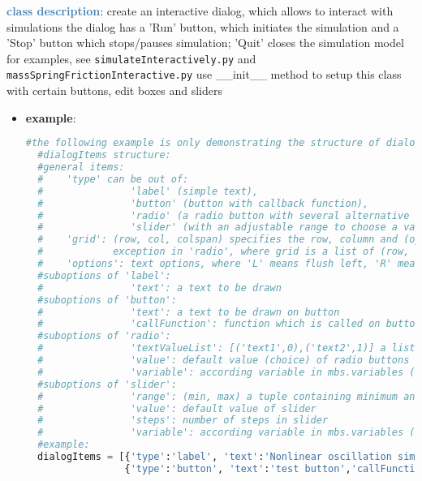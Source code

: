 \begin{itemize}[leftmargin=1.4cm]
\begin{itemize}[leftmargin=1.4cm]
\begin{itemize}[leftmargin=1.4cm]
\begin{itemize}[leftmargin=0.5cm]
\begin{itemize}[leftmargin=1.4cm]
\begin{itemize}[leftmargin=1.4cm]
\begin{itemize}[leftmargin=0.5cm]
\begin{itemize}[leftmargin=1.4cm]
\begin{itemize}[leftmargin=0.5cm]
\begin{itemize}[leftmargin=1.4cm]
\begin{itemize}[leftmargin=1.4cm]
\ei
{}
\noindent\textcolor{steelblue}{{\bf class description}}:  create an interactive dialog, which allows to interact with simulations
the dialog has a 'Run' button, which initiates the simulation and a 'Stop' button which stops/pauses simulation; 'Quit' closes the simulation model
for examples, see \texttt{simulateInteractively.py} and \texttt{massSpringFrictionInteractive.py}
use \_\_init\_\_ method to setup this class with certain buttons, edit boxes and sliders
\setlength{\itemindent}{0.7cm}
\begin{itemize}[leftmargin=0.7cm]
\item[--]
{\bf example}: \vspace{-12pt}\ei\begin{lstlisting}[language=Python, xleftmargin=36pt]
  #the following example is only demonstrating the structure of dialogItems and plots
  #dialogItems structure:
  #general items:
  #    'type' can be out of:
  #               'label' (simple text),
  #               'button' (button with callback function),
  #               'radio' (a radio button with several alternative options),
  #               'slider' (with an adjustable range to choose a value)
  #    'grid': (row, col, colspan) specifies the row, column and (optionally) the span of columns the item is placed at;
  #            exception in 'radio', where grid is a list of (row, col) for every choice
  #    'options': text options, where 'L' means flush left, 'R' means flush right
  #suboptions of 'label':
  #               'text': a text to be drawn
  #suboptions of 'button':
  #               'text': a text to be drawn on button
  #               'callFunction': function which is called on button-press
  #suboptions of 'radio':
  #               'textValueList': [('text1',0),('text2',1)] a list of texts with according values
  #               'value': default value (choice) of radio buttons
  #               'variable': according variable in mbs.variables (or mbs.sys), which is set to current radio button value
  #suboptions of 'slider':
  #               'range': (min, max) a tuple containing minimum and maximum value of slider
  #               'value': default value of slider
  #               'steps': number of steps in slider
  #               'variable': according variable in mbs.variables (or mbs.sys), which is set to current slider value
  #example:
  dialogItems = [{'type':'label', 'text':'Nonlinear oscillation simulator', 'grid':(0,0,2), 'options':['L']},
                 {'type':'button', 'text':'test button','callFunction':ButtonCall, 'grid':(1,0,2)},

\end{lstlisting}
\end{itemize}
\end{itemize}
\end{itemize}
\end{itemize}
\end{itemize}
\end{itemize}
\end{itemize}
\end{itemize}
\end{itemize}
\end{itemize}
\end{itemize}
\end{itemize}
